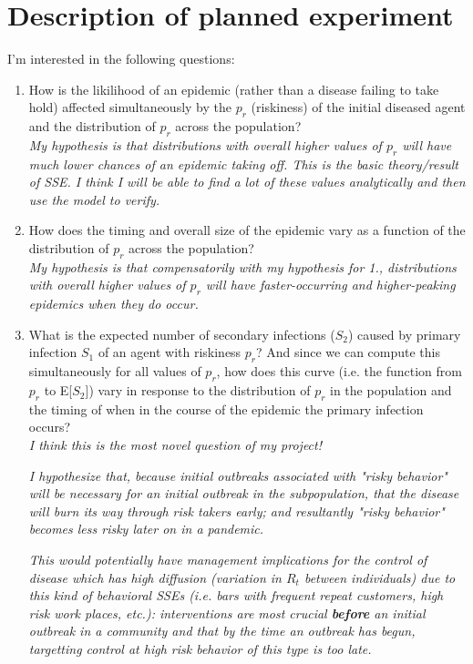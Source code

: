 \documentclass{article}
\begin{document}
\section{Description of planned experiment}
I'm interested in the following questions:\\

\begin{enumerate}
\item
How is the likilihood of an epidemic (rather than a disease failing to take hold)
affected simultaneously by the $p_r$ (riskiness) of the initial diseased agent
and the distribution of $p_r$ across the population?\\

\textit{My hypothesis is that distributions with overall higher values of
$p_r$ will have much lower chances of an epidemic taking off. This is
the basic theory/result of SSE. I think I will be able to find a lot of these
values analytically and then use the model to verify.}

\item
How does the timing and overall size of the epidemic vary as a function of
the distribution of $p_r$ across the population?\\

\textit{My hypothesis is that compensatorily with my hypothesis for 1.,
distributions with overall higher values of $p_r$ will have faster-occurring
and higher-peaking epidemics when they do occur.}

\item
What is the expected number of secondary infections ($S_2$) caused by
primary infection $S_1$ of an agent with riskiness $p_r$?  And since we can
compute this simultaneously for all values of $p_r$, how does this curve
(i.e. the function from $p_r$ to E[$S_2$]) vary in response to the distribution
of $p_r$ in the population and the timing of when in the course of the epidemic
the primary infection occurs?\\

\textit{
I think this is the most novel question of my project!\\}

\textit{
I hypothesize that, because initial outbreaks associated with "risky behavior"
will be necessary for an initial outbreak in the subpopulation, that the
disease will burn its way through risk takers early; and resultantly "risky
behavior" becomes less risky later on in a pandemic.\\}

\textit{
This would potentially have management implications for the control of disease
which has high diffusion (variation in $R_t$ between individuals) due to
this kind of behavioral SSEs (i.e. bars with frequent repeat customers,
high risk work places, etc.): interventions are most crucial \textbf{before} an initial outbreak in a community and that by the time an outbreak has begun,
targetting control at high risk behavior of this type is too late.}
\end{enumerate}
\end{document}

